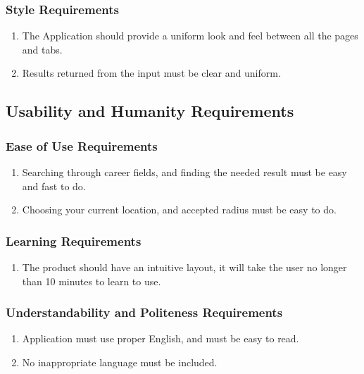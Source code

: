 \documentclass[english]{article}
\begin{document}
\subsubsection{Style Requirements}
\label{ssub:style_requirements}
\begin{enumerate}[{SR}1. ]
\item The Application should provide a uniform look and feel between all the pages and tabs.

\item Results returned from the input must be clear and uniform. 
\end{enumerate}


\subsection{Usability and Humanity Requirements}
\label{sub:usability_and_humanity_requirements}

\subsubsection{Ease of Use Requirements}
\label{ssub:ease_of_use_requirements}
\begin{enumerate}[{EUR}1. ]

\item Searching through career fields, and finding the needed result must be easy and fast to do. 

\item Choosing your current location, and accepted radius must be easy to do. 

\end{enumerate}


\subsubsection{Learning Requirements}
\label{ssub:learning_requirements}
\begin{enumerate}[{LR}1. ]
\item The product should have an intuitive layout, it will take the user no longer than 10 minutes to learn to use. 
\end{enumerate}

\subsubsection{Understandability and Politeness Requirements}
\label{ssub:understandability_and_politeness_requirements}
\begin{enumerate}[{UPR}1. ]
\item Application must use proper English, and must be easy to read. 

\item No inappropriate language must be included. 
\end{enumerate}
\end{document}
